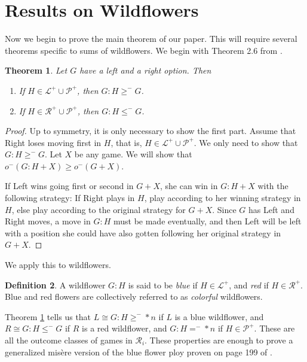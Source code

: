 \documentclass{amsart}
\theoremstyle{plain}
\newtheorem{thm}{Theorem}
\theoremstyle{definition}
\newtheorem{defn}[thm]{Definition}
\theoremstyle{remark}
\numberwithin{equation}{section}
\numberwithin{thm}{section}
\begin{document}
    \section{Results on Wildflowers}
\label{5}
Now we begin to prove the main theorem of our paper. This will require several theorems specific to sums of wildflowers.
We begin with Theorem 2.6 from \cite{mckay2016misere}. 

\begin{thm}
  \label{ord_sum_ord}
    Let $G$ have a left and a right option. Then 
    \begin{enumerate}
        \item   If $H \in \mathcal{L}^+ \cup \mathcal{P}^+$, then $G:H\geq^- G$.
        \item  If $H \in \mathcal{R}^+ \cup \mathcal{P}^+$, then $G:H \leq^- G$.
    \end{enumerate}
\end{thm}

  \begin{proof}
      Up to symmetry, it is only necessary to show the first part. Assume that Right loses moving first in $H$, that is, $H \in \mathcal{L}^+ \cup \mathcal{P}^+$. We only need to show that $G:H \geq^- G$. Let $X$ be any game. We will show that $o^-(G:H+X) \geq o^-(G+X)$.

      If Left wins going first or second in $G+X$, she can win in $G:H+X$ with the following strategy: If Right plays in $H$, play according to her winning strategy in $H$, else play according to the original strategy for $G+X$. Since $G$ has Left and Right moves, a move in $G:H$ must be made eventually, and then Left will be left with a position she could have also gotten following her original strategy in $G+X$.
\end{proof}
We apply this to wildflowers.
\begin{defn}
    A wildflower $G:H$ is said to be \emph{blue} if $H \in \mathcal{L}^+$, and \emph{red} if $H \in \mathcal{R}^+$. Blue and red flowers are collectively referred to as \emph{colorful} wildflowers.
\end{defn}
Theorem \ref{ord_sum_ord} tells us that $L \cong G:H \geq^- *n$ if $L$ is a blue wildflower, and $R\cong G:H \leq^- G$ if $R$ is a red wildflower, and $G:H =^- *n$ if $H \in \mathcal{P}^+$. These are all the outcome classes of games in $\mathscr{R}_i$. These properties are enough to prove a generalized mis\`ere version of the blue flower ploy proven on page 199 of \cite{WinningWays}. 
\end{document}
